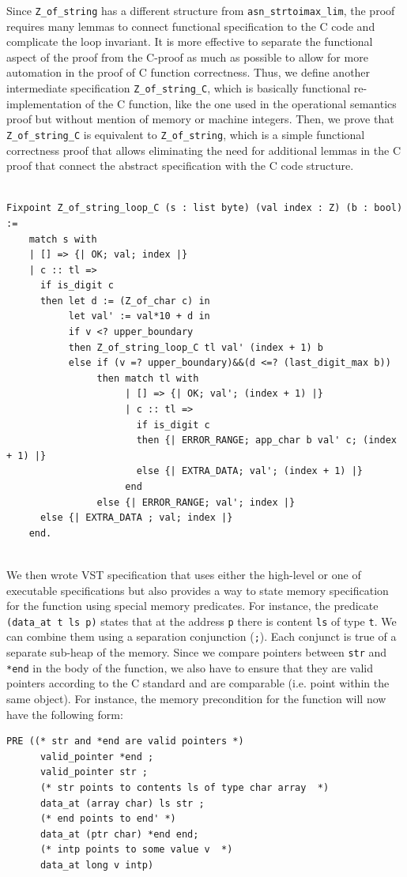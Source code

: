 \documentclass[acmsmall,nonacm]{acmart}
\begin{document}
 Since \texttt{Z\_of\_string} has a different structure from
 \texttt{asn\_strtoimax\_lim}, the proof requires many lemmas to
 connect functional specification to the C code and complicate the loop
 invariant. It is more effective to separate the
 functional aspect of the proof from the C-proof as much as possible to
 allow for more automation in the proof of C function
 correctness. Thus, we define another intermediate specification
 \texttt{Z\_of\_string\_C}, which is basically functional
 re-implementation of the C function, like the one used in the
 operational semantics proof but without mention of memory or machine integers. Then,
 we prove that \texttt{Z\_of\_string\_C} is equivalent to
 \texttt{Z\_of\_string}, which is a simple functional correctness
 proof that allows eliminating the need for additional lemmas in the
 C proof that connect the abstract specification with the C code structure.

 \begin{lstlisting}[language=Coq]
 
Fixpoint Z_of_string_loop_C (s : list byte) (val index : Z) (b : bool) := 
    match s with 
    | [] => {| OK; val; index |}
    | c :: tl => 
      if is_digit c
      then let d := (Z_of_char c) in 
           let val' := val*10 + d in
           if v <? upper_boundary 
           then Z_of_string_loop_C tl val' (index + 1) b
           else if (v =? upper_boundary)&&(d <=? (last_digit_max b))
                then match tl with
                     | [] => {| OK; val'; (index + 1) |}
                     | c :: tl => 
                       if is_digit c
                       then {| ERROR_RANGE; app_char b val' c; (index + 1) |}
                       else {| EXTRA_DATA; val'; (index + 1) |}
                     end
                else {| ERROR_RANGE; val'; index |}      
      else {| EXTRA_DATA ; val; index |}              
    end.
    
 \end{lstlisting}

 We then wrote VST specification that uses either the high-level
 or one of executable specifications but also provides a way to
 state memory specification for the function using special memory
 predicates. For instance, the predicate \texttt{(data\_at t ls p)}
 states that at the address \texttt{p} there is content \texttt{ls} of
 type \texttt{t}. We can combine them using a separation conjunction
 (\texttt{;}). Each conjunct is true of a separate sub-heap of the
 memory. Since we compare pointers between \texttt{str} and \texttt{*end} in the body of the function, we also have to ensure
 that they are valid pointers according to the C standard and are
 comparable (i.e. point within the same object). For instance, the
 memory precondition for the function will now have the following form:
\begin{lstlisting}[language=Coq]
PRE ((* str and *end are valid pointers *)
      valid_pointer *end ;
      valid_pointer str ;
      (* str points to contents ls of type char array  *)
      data_at (array char) ls str ; 
      (* end points to end' *)
      data_at (ptr char) *end end;
      (* intp points to some value v  *)
      data_at long v intp)
     \end{lstlisting}
\end{document}

